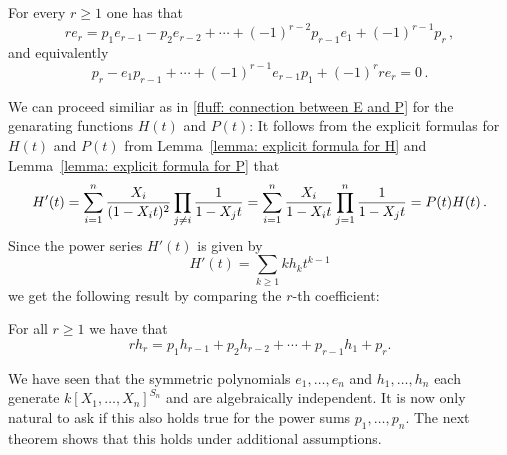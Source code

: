 \begin{corollary}
  \label{corollary: Newtons identities}
  For every $r \geq 1$ one has that
  \[
      r e_r
    =   p_1 e_{r-1}
      - p_2 e_{r-2}
      + \dotsb
      + (-1)^{r-2}  p_{r-1} e_1
      + (-1)^{r-1}  p_r \,,
  \]
  and equivalently
  \[
        p_r
      - e_1 p_{r-1}
      + \dotsb
      + (-1)^{r-1} e_{r-1} p_1
      + (-1)^r r e_r
    = 0 \,.
  \]
\end{corollary}


\begin{fluff}
  We can proceed similiar as in \ref{fluff: connection between E and P} for the genarating functions $H(t)$ and $P(t)$:
  It follows from the explicit formulas for $H(t)$ and $P(t)$ from Lemma~\ref{lemma: explicit formula for H} and Lemma~\ref{lemma: explicit formula for P} that
  \[
      H'(t)
    = \sum_{i=1}^n \frac{X_i}{(1-X_i t)^2} \prod_{j \neq i} \frac{1}{1 - X_j t} \\
    = \sum_{i=1}^n \frac{X_i}{1 - X_i t} \prod_{j=1}^n \frac{1}{1 - X_j t}
    = P(t) H(t) \,.
  \]
  Since the power series $H'(t)$ is given by
  \[
      H'(t)
    = \sum_{k \geq 1} k h_k t^{k-1}
  \]
  we get the following result by comparing the $r$-th coefficient:
\end{fluff}


\begin{corollary}
  \label{corollary: relation between h and p}
  For all $r \geq 1$ we have that
  \[
      r h_r
    =   p_1 h_{r-1}
      + p_2 h_{r-2}
      + \dotsb
      + p_{r-1} h_1
      + p_r.
  \]
\end{corollary}


\begin{fluff}
  We have seen that the symmetric polynomials $e_1, \dotsc, e_n$ and $h_1, \dotsc, h_n$ each generate $k[X_1, \dotsc, X_n]^{S_n}$ and are algebraically independent.
  It is now only natural to ask if this also holds true for the power sums $p_1, \dotsc, p_n$.
  The next theorem shows that this holds under additional assumptions.
\end{fluff}


